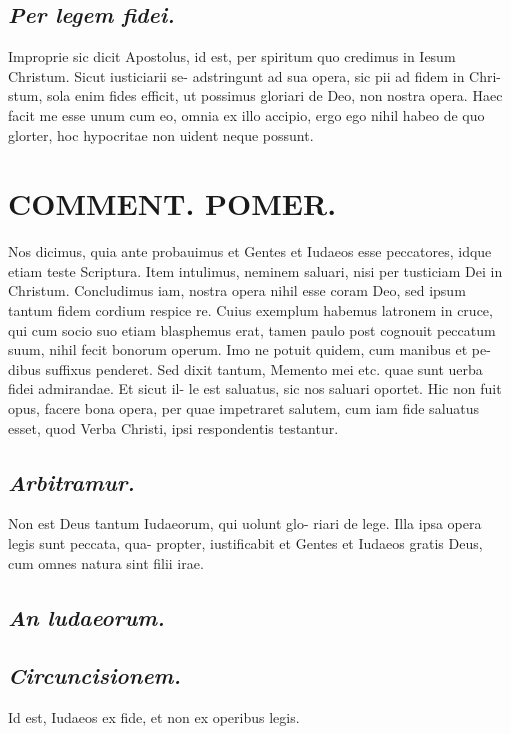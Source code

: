 \documentclass{article}
\begin{document}
\begin{pages}
\subsection*{\textit{Per legem fidei. }}\pstart Improprie sic dicit Apostolus, id est, per spiritum quo credimus in Iesum Christum. Sicut iusticiarii se- adstringunt ad sua opera, sic pii ad fidem in Chri- stum, sola enim fides efficit, ut possimus gloriari de Deo, non nostra opera. Haec facit me esse unum cum eo, omnia ex illo accipio, ergo ego nihil habeo de quo glorter, hoc hypocritae non uident neque possunt.  \pend
\section*{COMMENT. POMER.  }\pstart Nos dicimus, quia ante probauimus et Gentes et Iudaeos esse peccatores, idque etiam teste Scriptura. Item intulimus, neminem saluari, nisi per tusticiam Dei in Christum. Concludimus iam, nostra opera nihil esse coram Deo, sed ipsum tantum fidem cordium respice re. Cuius exemplum habemus latronem in cruce, qui cum socio suo etiam blasphemus erat, tamen paulo post cognouit peccatum suum, nihil fecit bonorum operum. Imo ne potuit quidem, cum manibus et pe- dibus suffixus penderet. Sed dixit tantum, Memento mei etc. quae sunt uerba fidei admirandae. Et sicut il- le est saluatus, sic nos saluari oportet. Hic non fuit opus, facere bona opera, per quae impetraret salutem, cum iam fide saluatus esset, quod Verba Christi, ipsi respondentis testantur.   \pend
{}
{}
\subsection*{\textit{Arbitramur. }}\pstart Non est Deus tantum Iudaeorum, qui uolunt glo- riari de lege. Illa ipsa opera legis sunt peccata, qua- propter, iustificabit et Gentes et Iudaeos gratis Deus, cum omnes natura sint filii irae.   \pend
{}
{}
\subsection*{\textit{An ludaeorum. }}
{}
\subsection*{\textit{Circuncisionem. }}\pstart Id est, Iudaeos ex fide, et non ex operibus legis.  \pend
{}
{}

\end{pages}
\end{document}
